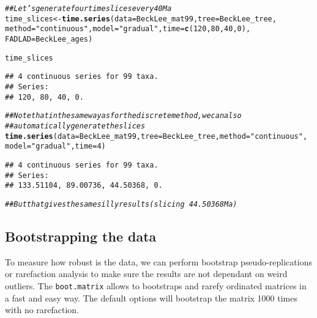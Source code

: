 \documentclass{article}\usepackage[]{graphicx}\usepackage[]{color}
\makeatletter
\newcommand{\hlnum}[1]{\textcolor[rgb]{0.686,0.059,0.569}{#1}}%
\newcommand{\hlstr}[1]{\textcolor[rgb]{0.192,0.494,0.8}{#1}}%
\newcommand{\hlcom}[1]{\textcolor[rgb]{0.678,0.584,0.686}{\textit{#1}}}%
\newcommand{\hlstd}[1]{\textcolor[rgb]{0.345,0.345,0.345}{#1}}%
\newcommand{\hlkwb}[1]{\textcolor[rgb]{0.69,0.353,0.396}{#1}}%
\newcommand{\hlkwc}[1]{\textcolor[rgb]{0.333,0.667,0.333}{#1}}%
\newcommand{\hlkwd}[1]{\textcolor[rgb]{0.737,0.353,0.396}{\textbf{#1}}}%
\newenvironment{kframe}{%
 \def\at@end@of@kframe{}%
 \ifinner\ifhmode%
  \def\at@end@of@kframe{\end{minipage}}%
  \begin{minipage}{\columnwidth}%
 \fi\fi%
 \def\FrameCommand##1{\hskip\@totalleftmargin \hskip-\fboxsep
 \colorbox{shadecolor}{##1}\hskip-\fboxsep
     \hskip-\linewidth \hskip-\@totalleftmargin \hskip\columnwidth}%
 \MakeFramed {\advance\hsize-\width
   \@totalleftmargin\z@ \linewidth\hsize
   \@setminipage}}%
 {\par\unskip\endMakeFramed%
 \at@end@of@kframe}
\newenvironment{knitrout}{}{} %
\makeatother
\begin{document}
\begin{knitrout}
\color{fgcolor}\begin{kframe}
\begin{alltt}
\hlcom{## Let's generate four time slices every 40 Ma}
\hlstd{time_slices} \hlkwb{<-} \hlkwd{time.series}\hlstd{(}\hlkwc{data} \hlstd{= BeckLee_mat99,} \hlkwc{tree} \hlstd{= BeckLee_tree,}
    \hlkwc{method} \hlstd{=} \hlstr{"continuous"}\hlstd{,} \hlkwc{model} \hlstd{=} \hlstr{"gradual"}\hlstd{,} \hlkwc{time} \hlstd{=} \hlkwd{c}\hlstd{(}\hlnum{120}\hlstd{,} \hlnum{80}\hlstd{,} \hlnum{40}\hlstd{,} \hlnum{0}\hlstd{),}
    \hlkwc{FADLAD} \hlstd{= BeckLee_ages)}
\end{alltt}


{\ttfamily\noindent\itshape\color{messagecolor}{\#\# Some tips have FAD/LAD and are assumed to interval single points in time.}}\begin{alltt}
\hlstd{time_slices}
\end{alltt}
\begin{verbatim}
## 4 continuous series for 99 taxa. 
## Series:
## 120, 80, 40, 0.
\end{verbatim}
\begin{alltt}
\hlcom{## Note that in the same way as for the discrete method, we can also}
\hlcom{## automatically generate the slices}
\hlkwd{time.series}\hlstd{(}\hlkwc{data} \hlstd{= BeckLee_mat99,} \hlkwc{tree} \hlstd{= BeckLee_tree,} \hlkwc{method} \hlstd{=} \hlstr{"continuous"}\hlstd{,}
    \hlkwc{model} \hlstd{=} \hlstr{"gradual"}\hlstd{,} \hlkwc{time} \hlstd{=} \hlnum{4}\hlstd{)}
\end{alltt}


{\ttfamily\noindent\itshape\color{messagecolor}{\#\# No FADLAD table has been provided so every tip is assumed to interval single points in time.}}\begin{verbatim}
## 4 continuous series for 99 taxa. 
## Series:
## 133.51104, 89.00736, 44.50368, 0.
\end{verbatim}
\begin{alltt}
\hlcom{## But that gives the same silly results (slicing ~ 44.50368 Ma)}
\end{alltt}
\end{kframe}
\end{knitrout}

\subsection{Bootstrapping the data}
To measure how robust is the data, we can perform bootstrap pseudo-replications or rarefaction analysis to make sure the results are not dependant on weird outliers.
The \texttt{boot.matrix} allows to bootstraps and rarefy ordinated matrices in a fast and easy way.
The default options will bootstrap the matrix 1000 times with no rarefaction.
\end{document}
